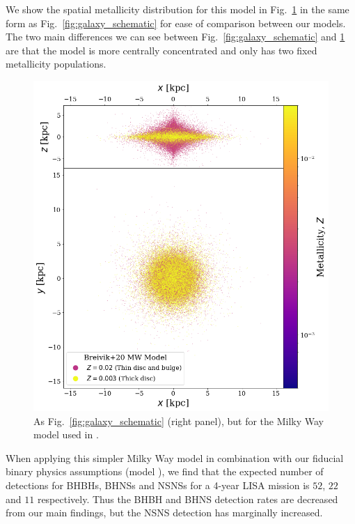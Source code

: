 We show the spatial metallicity distribution for this model in Fig.~\ref{fig:simple_mw} in the same form as Fig.~\ref{fig:galaxy_schematic} for ease of comparison between our models. The two main differences we can see between Fig.~\ref{fig:galaxy_schematic} and \ref{fig:simple_mw} are that the \citet{Breivik+2020} model is more centrally concentrated and only has two fixed metallicity populations.

\begin{figure}[htb]
    \centering
    \includegraphics[width=\columnwidth]{../figures/random_simple_galaxy.png}
    \caption{As Fig.~\ref{fig:galaxy_schematic} (right panel), but for the Milky Way model used in \citet{Breivik+2020}.}
    \label{fig:simple_mw}
\end{figure}

When applying this simpler Milky Way model in combination with our fiducial binary physics assumptions (model \modFid{}), we find that the expected number of detections for BHBHs, BHNSs and NSNSs for a 4-year LISA mission is $52$, $22$ and $11$ respectively. Thus the BHBH and BHNS detection rates are decreased from our main findings, but the NSNS detection has marginally increased.

